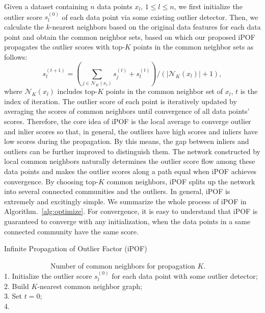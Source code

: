 \documentclass[sigconf,nonacm]{acmart}
\begin{document}
Given a dataset containing $n$ data points $x_l$, $1\leq l \leq n$, we first initialize the outlier score $s_l^{(0)}$ of each data point via some existing outlier detector. Then, we calculate the $k$-nearest neighbors based on the original data features for each data point and obtain the common neighbor sets, based on which our proposed iPOF propagates the outlier scores with top-$K$ points in the common neighbor sets as follows:
\begin{equation}\label{eq:update}
    s_l^{(t+1)} = (\sum_{j\in\mathcal{N}_K(x_l)} s_j^{(t)} + s_l^{(t)})/(|\mathcal{N}_K(x_l)|+1),
\end{equation}
where $\mathcal{N}_K(x_l)$ includes top-$K$ points in the common neighbor set of $x_l$, $t$ is the index of iteration. The outlier score of each point is iteratively updated by averaging the scores of common neighbors until convergence of all data points' scores. Therefore, the core idea of iPOF is the local average to converge outlier and inlier scores so that, in general, the outliers have high scores and inliers have low scores during the propagation. By this means, the gap between inliers and outliers can be further improved to distinguish them. The network constructed by local common neighbors naturally determines the outlier score flow among these data points and makes the outlier scores along a path equal when iPOF achieves convergence. By choosing top-$K$ common neighbors, iPOF splits up the network into several connected communities and the outliers. In general, iPOF is extremely and excitingly simple. We summarize the whole process of iPOF in Algorithm.\textcolor{red}{~\ref{alg:optimize}}. For convergence, it is easy to understand that iPOF is guaranteed to converge with any initialization, when the data points in a same connected community have the same score. 

\begin{algorithm}[t]
\caption{Infinite Propagation of Outlier Factor (iPOF)}\label{alg:optimize}
    \ \ \ \ \ \ \ \ \ \ \  \ \ Number of common neighbors for propagation $K$.\\
    1. Initialize the outlier score $s_l^{(0)}$ for each data point with some outlier detector;\\
    2. Build $K$-nearest common neighbor graph;\\
    3. Set $t=0$;\\
    4. 
\end{algorithm}
\end{document}
